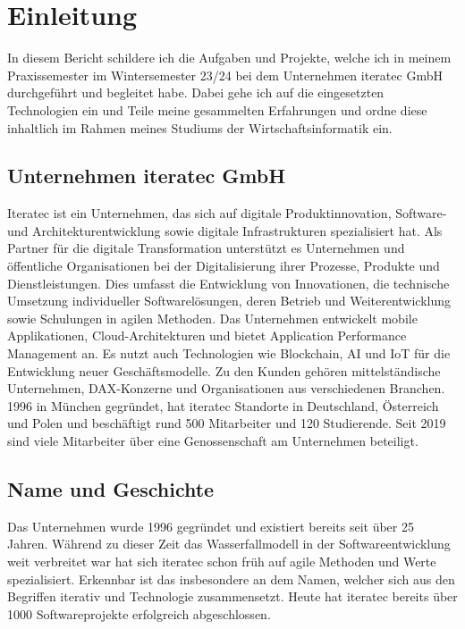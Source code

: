 \chapter{Einleitung}
In diesem Bericht schildere ich die Aufgaben und Projekte, welche ich in meinem Praxissemester im Wintersemester 23/24
bei dem Unternehmen iteratec GmbH durchgeführt und begleitet habe. Dabei gehe ich auf die eingesetzten Technologien ein
und Teile meine gesammelten Erfahrungen und ordne diese inhaltlich im Rahmen meines Studiums der Wirtschaftsinformatik
ein.

\section{Unternehmen iteratec GmbH}

Iteratec ist ein Unternehmen, das sich auf digitale Produktinnovation, Software- und Architekturentwicklung sowie
digitale Infrastrukturen spezialisiert hat. Als Partner für die digitale Transformation unterstützt es Unternehmen und
öffentliche Organisationen bei der Digitalisierung ihrer Prozesse, Produkte und Dienstleistungen. Dies umfasst die
Entwicklung von Innovationen, die technische Umsetzung individueller Softwarelösungen, deren Betrieb und
Weiterentwicklung sowie Schulungen in agilen Methoden. Das Unternehmen entwickelt mobile Applikationen,
Cloud-Architekturen und bietet Application Performance Management an. Es nutzt auch Technologien wie Blockchain, AI und
IoT für die Entwicklung neuer Geschäftsmodelle. Zu den Kunden gehören mittelständische Unternehmen, DAX-Konzerne und
Organisationen aus verschiedenen Branchen. 1996 in München gegründet, hat iteratec Standorte in Deutschland, Österreich
und Polen und beschäftigt rund 500 Mitarbeiter und 120 Studierende. Seit 2019 sind viele Mitarbeiter über eine
Genossenschaft am Unternehmen beteiligt.

\section{Name und Geschichte}
Das Unternehmen wurde 1996 gegründet und existiert bereits seit über 25 Jahren. Während zu dieser Zeit das
Wasserfallmodell in der Softwareentwicklung weit verbreitet war hat sich iteratec schon früh auf agile Methoden und
Werte spezialisiert. Erkennbar ist das insbesondere an dem Namen, welcher sich aus den Begriffen iterativ und
Technologie zusammensetzt. Heute hat iteratec bereits über 1000 Softwareprojekte erfolgreich abgeschlossen.

